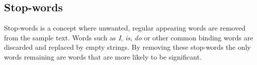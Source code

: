 \subsection{Stop-words}
Stop-words is a concept where unwanted, regular appearing words are removed from the sample text. Words such as \emph{I}, \emph{is}, \emph{do} or other common binding words are discarded and replaced by empty strings. By removing these stop-words the only words remaining are words that are more likely to be significant. 